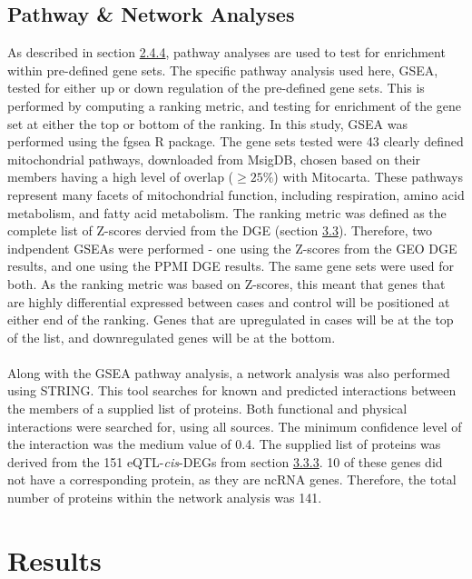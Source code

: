 \documentclass{article}
\begin{document}
\subsection{Pathway \& Network Analyses}
\label{subsec:pathways}
As described in section \hyperref[subsubsec:pathwaysandnetworks]{2.4.4}, pathway analyses are used to test for enrichment within pre-defined gene sets. The specific pathway analysis used here, GSEA, tested for either up or down regulation of the pre-defined gene sets. This is performed by computing a ranking metric, and testing for enrichment of the gene set at either the top or bottom of the ranking. In this study, GSEA was performed using the fgsea\cite{KorotkevichG2019FastAnalysis} R package. The gene sets tested were 43 clearly defined mitochondrial pathways, downloaded from MsigDB\cite{Liberzon2011Molecular3.0}, chosen based on their members having a high level of overlap ($\geq25\%$) with Mitocarta\cite{Rath2021MitoCarta3.0:Annotations}. These pathways represent many facets of mitochondrial function, including respiration, amino acid metabolism, and fatty acid metabolism. The ranking metric was defined as the complete list of Z-scores dervied from the DGE (section \hyperref[subsec:validation]{3.3}). Therefore, two indpendent GSEAs were performed - one using the Z-scores from the GEO DGE results, and one using the PPMI DGE results. The same gene sets were used for both. As the ranking metric was based on Z-scores, this meant that genes that are highly differential expressed between cases and control will be positioned at either end of the ranking. Genes that are upregulated in cases will be at the top of the list, and downregulated genes will be at the bottom. 
\\
\\Along with the GSEA pathway analysis, a network analysis was also performed using STRING\cite{Szklarczyk2023TheInterest}. This tool searches for known and predicted interactions between the members of a supplied list of proteins. Both functional and physical interactions were searched for, using all sources. The minimum confidence level of the interaction was the medium value of 0.4. The supplied list of proteins was derived from the 151 eQTL-\textit{cis}-DEGs from section \hyperref[subsubsec:validation]{3.3.3}. 10 of these genes did not have a corresponding protein, as they are ncRNA genes. Therefore, the total number of proteins within the network analysis was 141.
\newpage
\section{Results}
\end{document}
